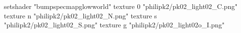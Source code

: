 setshader "bumpspecmapglowworld"
    texture 0 "philipk2/pk02_light02_C.png"
    texture n "philipk2/pk02_light02_N.png"
    texture s "philipk2/pk02_light02_S.png"
    texture g "philipk2/pk02_light02o_I.png"